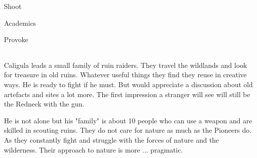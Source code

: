 \begin{npcBox}[title=Caligula]

    \begin{aspects}
    \item {}
    \item {}    
    \end{aspects}
    
    \begin{skills}
    \item {} Shoot
    \item {} Academics
    \item {} Provoke
    \end{skills}
    
    \begin{stunts}
    \item {}
    \end{stunts}
    
    \begin{stressSection}
    \end{stressSection}
    \begin{tabularx}{\textwidth}{ XX }
    \end{tabularx}
    
    \begin{consequences}
    \item {}
    \item {}
    \item {}
    \end{consequences}
    
    \begin{npcDescription}
    Caligula leads a small family of ruin raiders. They travel the wildlands and look for treasure in old ruins. Whatever useful things they find they reuse in creative ways.
    He is ready to fight if he must. But would appreciate a discussion about old artefacts and sites a lot more. The first impression a stranger will see will still be the Redneck with the gun.
    \end{npcDescription}
    
    \end{npcBox}

He is not alone but his "family" is about 10 people who can use a weapon and are skilled in scouting ruins. They do not care for nature as much as the Pioneers do. As they constantly fight and struggle with the forces of nature and the wilderness. Their approach to nature is more ... pragmatic.

